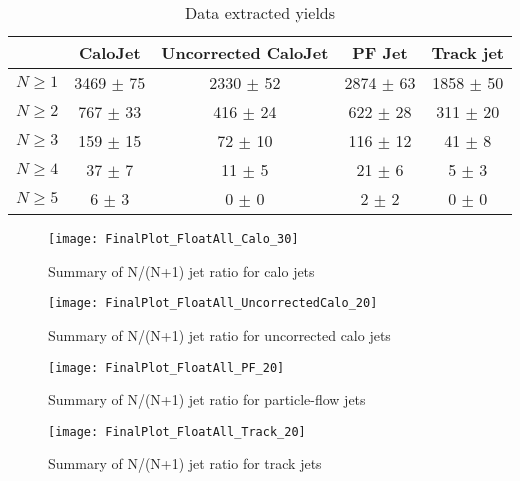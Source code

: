 \documentclass{cmspaper}
\begin{document}
\begin{table}
\caption{Data extracted yields}
\centering
   \begin{tabular}{|c|c|c|c|c|}
      \hline
      & CaloJet & Uncorrected CaloJet & PF Jet & Track jet \\\hline
      $N \ge 1$ & 3469 $\pm$ 75 & 2330 $\pm$ 52 & 2874 $\pm$ 63 & 1858 $\pm$ 50 \\\hline
      $N \ge 2$ & 767 $\pm$ 33 & 416 $\pm$ 24 & 622 $\pm$ 28 & 311 $\pm$ 20 \\\hline
      $N \ge 3$ & 159 $\pm$ 15 & 72 $\pm$ 10 & 116 $\pm$ 12 & 41 $\pm$ 8 \\\hline
      $N \ge 4$ & 37 $\pm$ 7 & 11 $\pm$ 5 & 21 $\pm$ 6 & 5 $\pm$ 3 \\\hline
      $N \ge 5$ & 6 $\pm$ 3 & 0 $\pm$ 0 & 2 $\pm$ 2 & 0 $\pm$ 0 \\\hline
   \end{tabular}
   \label{Table_DataExtractedYields}
\end{table}

\begin{figure}[hbtp]
   \begin{center} 
  \texttt{[image: FinalPlot\_FloatAll\_Calo\_30]}
   \caption{Summary of N/(N+1) jet ratio for calo jets}
   \label{Figure_RatioFromDataCaloJet}
   \end{center}
\end{figure}

\begin{figure}[hbtp]
   \begin{center}
   \texttt{[image: FinalPlot\_FloatAll\_UncorrectedCalo\_20]}
   \caption{Summary of N/(N+1) jet ratio for uncorrected calo jets}
   \label{Figure_RatioFromDataUncorrectedCaloJet}
   \end{center}
\end{figure}

\begin{figure}[hbtp]
   \begin{center}
   \texttt{[image: FinalPlot\_FloatAll\_PF\_20]}
   \caption{Summary of N/(N+1) jet ratio for particle-flow jets}
   \label{Figure_RatioFromDataPFJet}
   \end{center}
\end{figure}

\begin{figure}[hbtp]
   \begin{center}
   \texttt{[image: FinalPlot\_FloatAll\_Track\_20]}
   \caption{Summary of N/(N+1) jet ratio for track jets}
   \label{Figure_RatioFromDataTrackJet}
   \end{center}
\end{figure}
\end{document}
